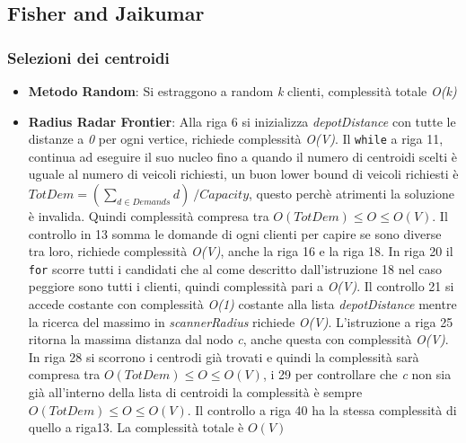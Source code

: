 \documentclass[]{article}
\begin{document}
\subsection{Fisher and Jaikumar}

\subsubsection{Selezioni dei centroidi}

\begin{itemize}
\item \textbf{Metodo Random}: Si estraggono a random \emph{k} clienti, complessità totale \emph{O(k)}

\item  \textbf{Radius Radar Frontier}: 
Alla riga 6 si inizializza \textit{depotDistance} con tutte le distanze a \emph{0} per ogni vertice, richiede complessità \emph{O(V)}. Il \texttt{while} a riga 11, continua ad eseguire il suo nucleo fino a quando il numero di centroidi scelti è uguale al numero di veicoli richiesti, un buon lower bound di veicoli richiesti è \emph{$TotDem = (\sum_{d \in Demands} d)  \ / Capacity$}, questo perchè atrimenti la soluzione è invalida. Quindi complessità compresa tra \emph{$O(TotDem) \leq O \leq O(V)$}. Il controllo in 13 somma le domande di ogni clienti per capire se sono diverse tra loro, richiede complessità \emph{O(V)}, anche la riga 16 e la riga 18. In riga 20 il \texttt{for} scorre tutti i candidati che al come descritto dall'istruzione 18 nel caso peggiore sono tutti i clienti, quindi complessità pari a  \emph{O(V)}. Il controllo 21 si accede costante con complessità \emph{O(1)} costante alla lista \textit{depotDistance} mentre la ricerca del massimo in  \textit{scannerRadius} richiede \emph{O(V)}. L'istruzione a riga 25 ritorna la massima distanza dal nodo \emph{c}, anche questa con complessità \emph{O(V)}. In riga 28 si scorrono i centrodi già trovati e quindi la complessità sarà compresa tra \emph{$O(TotDem) \leq O \leq O(V)$}, i 29 per controllare che \emph{c} non sia già all'interno della lista di centroidi la complessità è sempre \emph{$O(TotDem) \leq O \leq O(V)$}. Il controllo a riga 40 ha la stessa complessità di quello a riga13. La complessità totale è \emph{$O(V)$}
\end{itemize}
\end{document}

